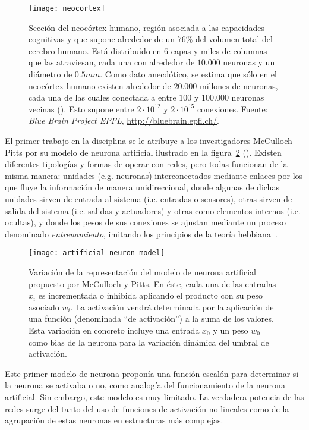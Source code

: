 \begin{figure}[t]
	\centering
	\texttt{[image: neocortex]}
	\caption[Ilustración de una sección del neocórtex humano]{Sección del neocórtex humano, región asociada a las capacidades cognitivas y que supone alrededor de un $76\%$ del volumen total del cerebro humano. Está distribuído en $6$ capas y miles de columnas que las atraviesan, cada una con alrededor de $10.000$ neuronas y un diámetro de $0.5mm$.  Como dato anecdótico, se estima que sólo en el neocórtex humano existen alrededor de $20.000$ millones de neuronas, cada una de las cuales conectada a entre $100$ y $100.000$ neuronas vecinas (\cite{Pakkenberg1997}). Esto supone entre $2 \cdot 10^{12}$ y $2 \cdot 10^{15}$ conexiones. Fuente: \textit{Blue Brain Project EPFL}, \url{http://bluebrain.epfl.ch/}.}
	\label{fig:neocortex}
\end{figure}

El primer trabajo en la disciplina se le atribuye a  los investigadores McCulloch-Pitts por su modelo de neurona artificial ilustrado en la figura~\ref{fig:mccullocs-pitts-neuron-model} (\cite{McCulloch1943}). Existen diferentes tipologías y formas de operar con redes, pero todas funcionan de la misma manera: unidades (e.g. neuronas) interconectados mediante enlaces por los que fluye la información de manera unidireccional, donde algunas de dichas unidades sirven de entrada al sistema (i.e. entradas o sensores), otras sirven de salida del sistema (i.e. salidas y actuadores) y otras como elementos internos (i.e. ocultas), y donde los pesos de sus conexiones se ajustan mediante un proceso denominado \textit{entrenamiento}, imitando los principios de la teoría hebbiana~\cite{hebb19680}.

\begin{figure}
	\centering
	\texttt{[image: artificial-neuron-model]}
	\caption[Modelo de neurona artificial de McCulloch y Pitts]{Variación de la representación del modelo de neurona artificial propuesto por McCulloch y Pitts. En éste, cada una de las entradas $x_i$ es incrementada o inhibida aplicando el producto con su peso asociado $w_i$. La activación vendrá determinada por la aplicación de una función (denominada \enquote{de activación}) a la suma de los valores. Esta variación en concreto incluye una entrada $x_0$ y un peso $w_0$ como bias de la neurona para la variación dinámica del umbral de activación.}
	\label{fig:mccullocs-pitts-neuron-model}
\end{figure}

Este primer modelo de neurona proponía una función escalón para determinar si la neurona se activaba o no, como analogía del funcionamiento de la neurona artificial. Sin embargo, este modelo es muy limitado. La verdadera potencia de las redes surge del tanto del uso de funciones de activación no lineales como de la agrupación de estas neuronas en estructuras más complejas.

